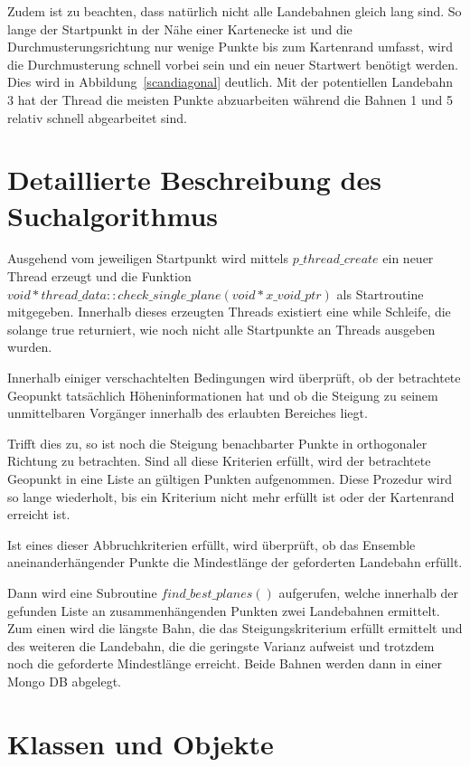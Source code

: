 \documentclass[10pt,a4paper]{report}
\begin{document}
Zudem ist zu beachten, dass natürlich nicht alle Landebahnen gleich lang sind. So lange der Startpunkt in der Nähe einer Kartenecke ist und die Durchmusterungsrichtung nur wenige Punkte bis zum Kartenrand umfasst, wird die Durchmusterung schnell vorbei sein und ein neuer Startwert benötigt werden. Dies wird in Abbildung~\ref{scandiagonal} deutlich. Mit der potentiellen Landebahn 3 hat der Thread die meisten Punkte abzuarbeiten während die Bahnen 1 und 5 relativ schnell abgearbeitet sind. 

\section{Detaillierte Beschreibung des Suchalgorithmus}

Ausgehend vom jeweiligen Startpunkt wird mittels $p\_thread\_create$ ein neuer Thread erzeugt und die Funktion $void *thread\_data::check\_single\_plane(void *x\_void\_ptr)$ als Startroutine mitgegeben. Innerhalb dieses erzeugten Threads existiert eine while Schleife, die solange true returniert, wie noch nicht alle Startpunkte an Threads ausgeben wurden.

Innerhalb einiger verschachtelten Bedingungen wird überprüft, ob der betrachtete Geopunkt tatsächlich Höheninformationen hat und ob die Steigung zu seinem unmittelbaren Vorgänger innerhalb des erlaubten Bereiches liegt.

Trifft dies zu, so ist noch die Steigung benachbarter Punkte in orthogonaler Richtung zu betrachten. Sind all diese Kriterien erfüllt, wird der betrachtete Geopunkt in eine Liste an gültigen Punkten aufgenommen. Diese Prozedur wird so lange wiederholt, bis ein Kriterium nicht mehr erfüllt ist oder der Kartenrand erreicht ist.

Ist eines dieser Abbruchkriterien erfüllt, wird überprüft, ob das Ensemble aneinanderhängender Punkte die Mindestlänge der geforderten Landebahn erfüllt.

Dann wird eine Subroutine $find\_best\_planes()$ aufgerufen, welche innerhalb der gefunden Liste an zusammenhängenden Punkten zwei Landebahnen ermittelt. Zum einen wird die längste Bahn, die das Steigungskriterium erfüllt ermittelt und des weiteren die Landebahn, die die geringste Varianz aufweist und trotzdem noch die geforderte Mindestlänge erreicht. 
Beide Bahnen werden dann in einer Mongo DB abgelegt.

\section{Klassen und Objekte}
\end{document}
